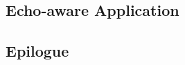 \documentclass[pdftex,dvipsnames]{dissertation}
\begin{document}
\begin{fullwidth}
\part{Echo-aware Application}
\end{fullwidth}
\parttoc[n]





\begin{fullwidth}
\part{Epilogue}
\end{fullwidth}
\parttoc[n]



\backmatter{}




% 
\end{document}
